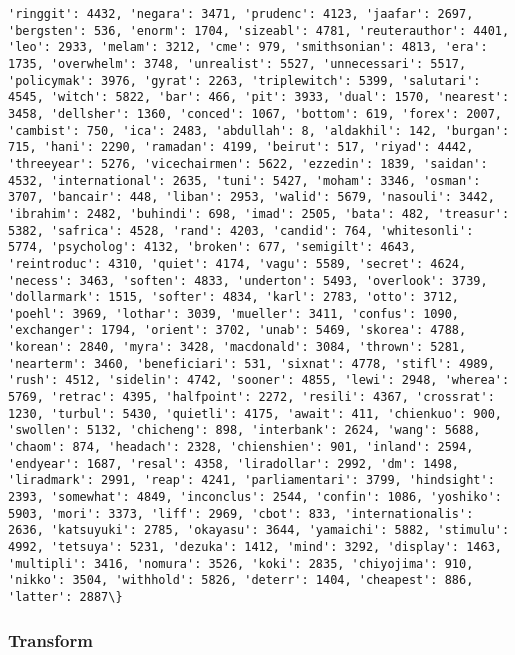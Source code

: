 \documentclass[11pt]{article}
\begin{document}
\begin{Verbatim}[commandchars=\\\{\}]
'ringgit': 4432, 'negara': 3471, 'prudenc': 4123, 'jaafar': 2697, 'bergsten': 536, 'enorm': 1704, 'sizeabl': 4781, 'reuterauthor': 4401, 'leo': 2933, 'melam': 3212, 'cme': 979, 'smithsonian': 4813, 'era': 1735, 'overwhelm': 3748, 'unrealist': 5527, 'unnecessari': 5517, 'policymak': 3976, 'gyrat': 2263, 'triplewitch': 5399, 'salutari': 4545, 'witch': 5822, 'bar': 466, 'pit': 3933, 'dual': 1570, 'nearest': 3458, 'dellsher': 1360, 'conced': 1067, 'bottom': 619, 'forex': 2007, 'cambist': 750, 'ica': 2483, 'abdullah': 8, 'aldakhil': 142, 'burgan': 715, 'hani': 2290, 'ramadan': 4199, 'beirut': 517, 'riyad': 4442, 'threeyear': 5276, 'vicechairmen': 5622, 'ezzedin': 1839, 'saidan': 4532, 'international': 2635, 'tuni': 5427, 'moham': 3346, 'osman': 3707, 'bancair': 448, 'liban': 2953, 'walid': 5679, 'nasouli': 3442, 'ibrahim': 2482, 'buhindi': 698, 'imad': 2505, 'bata': 482, 'treasur': 5382, 'safrica': 4528, 'rand': 4203, 'candid': 764, 'whitesonli': 5774, 'psycholog': 4132, 'broken': 677, 'semigilt': 4643, 'reintroduc': 4310, 'quiet': 4174, 'vagu': 5589, 'secret': 4624, 'necess': 3463, 'soften': 4833, 'underton': 5493, 'overlook': 3739, 'dollarmark': 1515, 'softer': 4834, 'karl': 2783, 'otto': 3712, 'poehl': 3969, 'lothar': 3039, 'mueller': 3411, 'confus': 1090, 'exchanger': 1794, 'orient': 3702, 'unab': 5469, 'skorea': 4788, 'korean': 2840, 'myra': 3428, 'macdonald': 3084, 'thrown': 5281, 'nearterm': 3460, 'beneficiari': 531, 'sixnat': 4778, 'stifl': 4989, 'rush': 4512, 'sidelin': 4742, 'sooner': 4855, 'lewi': 2948, 'wherea': 5769, 'retrac': 4395, 'halfpoint': 2272, 'resili': 4367, 'crossrat': 1230, 'turbul': 5430, 'quietli': 4175, 'await': 411, 'chienkuo': 900, 'swollen': 5132, 'chicheng': 898, 'interbank': 2624, 'wang': 5688, 'chaom': 874, 'headach': 2328, 'chienshien': 901, 'inland': 2594, 'endyear': 1687, 'resal': 4358, 'liradollar': 2992, 'dm': 1498, 'liradmark': 2991, 'reap': 4241, 'parliamentari': 3799, 'hindsight': 2393, 'somewhat': 4849, 'inconclus': 2544, 'confin': 1086, 'yoshiko': 5903, 'mori': 3373, 'liff': 2969, 'cbot': 833, 'internationalis': 2636, 'katsuyuki': 2785, 'okayasu': 3644, 'yamaichi': 5882, 'stimulu': 4992, 'tetsuya': 5231, 'dezuka': 1412, 'mind': 3292, 'display': 1463, 'multipli': 3416, 'nomura': 3526, 'koki': 2835, 'chiyojima': 910, 'nikko': 3504, 'withhold': 5826, 'deterr': 1404, 'cheapest': 886, 'latter': 2887\}

    \end{Verbatim}

    \subsubsection{Transform}\label{transform}
\end{document}

